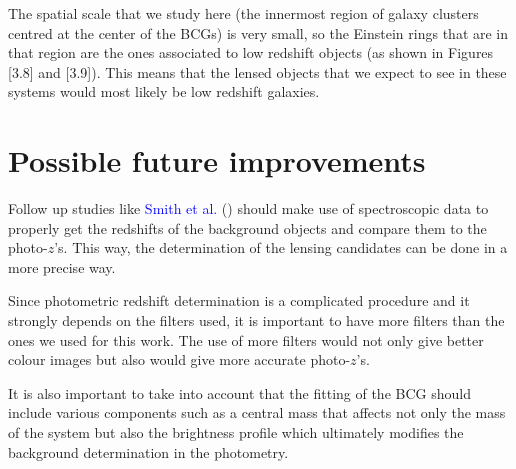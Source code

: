 The spatial scale that we study here (the innermost region of galaxy clusters centred at the center of the BCGs) is very small, so the Einstein rings that are in that region are the ones associated to low redshift objects (as shown in Figures [3.8] and [3.9]). This means that the lensed objects that we expect to see in these systems would most likely be low redshift galaxies.

\section{Possible future improvements}

Follow up studies like \textcolor{blue}{Smith et al.} (\citeyear{Reference34}) should make use of spectroscopic data to properly get the redshifts of the background objects and compare them to the photo-$z$'s. This way, the determination of the lensing candidates can be done in a more precise way.

Since photometric redshift determination is a complicated procedure and it strongly depends on the filters used, it is important to have more filters than the ones we used for this work. The use of more filters would not only give better colour images but also would give more accurate photo-$z$'s. 

It is also important to take into account that the fitting of the BCG should include various components such as a central mass that affects not only the mass of the system but also the brightness profile which ultimately modifies the background determination in the photometry.



